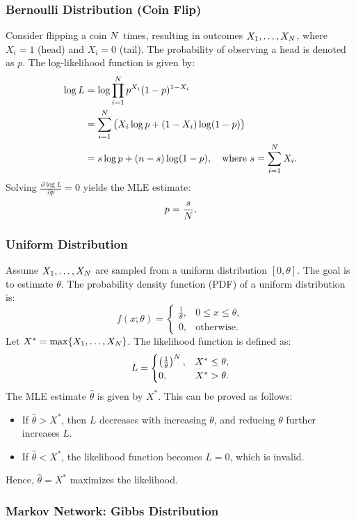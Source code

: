 \subsubsection{Bernoulli Distribution (Coin Flip)} Consider flipping a coin $N$ times, resulting in outcomes $X_1, \ldots, X_N$, where $X_i = 1$ (head) and $X_i = 0$ (tail). The probability of observing a head is denoted as $p$. The log-likelihood function is given by:
\[
\begin{aligned}
    \log L &= \log \prod_{i=1}^{N} p^{X_i} (1-p)^{1-X_i} \\
           &= \sum_{i=1}^{N} \big( X_i \log p + (1-X_i) \log(1-p) \big) \\
           &= s \log p + (n-s) \log (1-p), \quad \text{where } s = \sum_{i=1}^{N} X_i.
\end{aligned}
\]
Solving $\frac{\partial \log L}{\partial p} = 0$ yields the MLE estimate:
\[
p = \frac{s}{N}.
\]

\subsubsection{Uniform Distribution} 
Assume $X_1, \ldots, X_N$ are sampled from a uniform distribution $[0, \theta]$. The goal is to estimate $\theta$. The probability density function (PDF) of a uniform distribution is:
\[
f(x; \theta) = 
\begin{cases} 
    \frac{1}{\theta}, & 0 \leq x \leq \theta, \\
    0, & \text{otherwise}.
\end{cases}
\]
Let $X^\ast = \max \{X_1, \ldots, X_N\}$. The likelihood function is defined as:
\[
L = 
\begin{cases} 
    \left(\frac{1}{\theta}\right)^N, & X^\ast \leq \theta, \\
    0, & X^\ast > \theta.
\end{cases}
\]
The MLE estimate $\hat{\theta}$ is given by $X^\ast$. This can be proved as follows:
\begin{itemize}
    \item If $\hat{\theta} > X^\ast$, then $L$ decreases with increasing $\theta$, and reducing $\theta$ further increases $L$.
    \item If $\hat{\theta} < X^\ast$, the likelihood function becomes $L = 0$, which is invalid.
\end{itemize}
Hence, $\hat{\theta} = X^\ast$ maximizes the likelihood.

\subsubsection{Markov Network: Gibbs Distribution}

